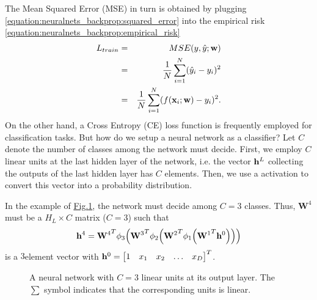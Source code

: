 \documentclass[letterpaper,10pt,english]{jupyterBook}
\let\sphinxpxdimen\pdfpxdimen\else\newdimen\sphinxpxdimen
\begin{document}
\sphinxAtStartPar
The Mean Squared Error (MSE) in turn is obtained by plugging \eqref{equation:neuralnets_backprop:squared_error} into the empirical risk \eqref{equation:neuralnets_backprop:empirical_risk}
\label{equation:neuralnets_backprop:e778dfca-47c1-490e-8cd0-627dfa62b95a}\begin{eqnarray}
L_{train} &=& MSE(y, \hat{y}; {\bf w}) \\
&=& \frac{1}{N} \sum_{i=1}^{N} (\hat{y}_{i} - y_{i})^2  \\
 &=& \frac{1}{N} \sum_{i=1}^{N} (f({\bf x}_{i}; {\bf w}) - y_{i})^2.
\end{eqnarray}
\sphinxAtStartPar
On the other hand, a Cross Entropy (CE) loss function is frequently employed for classification tasks. But how do we setup a neural network as a classifier? Let \(C\) denote the number of classes among the network must decide. First, we employ \(C\) linear units at the last hidden layer of the network, i.e. the vector \( {\bf h}^{L} \) collecting the outputs of the last hidden layer has \( C \) elements. Then, we use a  activation to convert this vector into a probability distribution.

\sphinxAtStartPar
In the example of \hyperref[\detokenize{neuralnets_backprop:classification-mlp-fig}]{Fig.\@ \ref{\detokenize{neuralnets_backprop:classification-mlp-fig}}}, the network must decide among \( C=3 \) classes. Thus, \(\mathbf{W}^{4}\) must be a \(H_L \times C\) matrix (\(C=3\)) such that \begin{equation*}
\begin{split} {\bf h}^{4} = {\mathbf{W}^{4}}^{T} \phi_3 \Big( {\mathbf{W}^{3}}^{T} \phi_2 \Big( {\mathbf{W}^{2}}^{T} \phi_1 \Big( {\mathbf{W}^{1}}^{T} {\bf h}^{0} \Big) \Big) \Big) \end{split}
\end{equation*} is a \( 3 \)\sphinxhyphen{}element vector with \( {\bf h}^{0} = \begin{bmatrix} 1 & x_1 & x_2 & \ldots & x_D \end{bmatrix}^{T} \).


\begin{figure}
\centering
\noindent\sphinxincludegraphics[height=320\sphinxpxdimen]{{classification_MLP}.svg}
\caption{A neural network with \( C = 3 \) linear units at its output layer. The \( \sum \) symbol indicates that the corresponding units is linear.}\label{\detokenize{neuralnets_backprop:classification-mlp-fig}}\end{figure}
\end{document}
